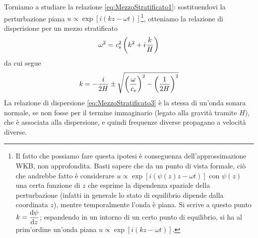 Torniamo a studiare la relazione \ref{eq:MezzoStratificato1}: sostituendovi la perturbazione piana $u \propto \exp [i(kz -\omega t)]$\footnote{Il fatto che possiamo fare questa ipotesi è conseguenza dell'approssimazione WKB, non approfondita. Basti sapere che da un punto di vista formale, ciò che andrebbe fatto è considerare $u \propto \exp [i(\psi(z)z -\omega t)]$ con $\psi(z)$ una certa funzione di $z$ che esprime la dipendenza spaziale della perturbazione (infatti in generale lo stato di equilibrio dipende dalla coordinata $z$), mentre temporalmente l'onda è piana. Si scrive a questo punto $k= \dfrac{\mathrm{d} {\psi}}{\mathrm{d} {z}}$; espandendo in un intorno di un certo punto di equilibrio, si ha al prim'ordine un'onda piana $u \propto \exp [i(kz -\omega t)]$.}, otteniamo la relazione di disperisione per un mezzo stratificato
\begin{equation}
\omega^2 = \textit{c}_{s}^2 \left( k^2 + i \dfrac{k}{H} \right) \label{eq:MezzoStratificato3}
\end{equation}
da cui segue
\begin{equation}
k = -\dfrac{i}{2H} \pm \sqrt{\left( \dfrac{\omega}{\textit{c}_{s}} \right)^2-\left( \dfrac{1}{2H} \right)^2}
\end{equation}
La relazione di dispersione \ref{eq:MezzoStratificato3} è la stessa di un'onda sonara normale, se non fosse per il termine immaginario (legato alla gravità tramite $H$), che è associata alla dispersione, e quindi frequenze diverse propagano a velocità diverse. 

